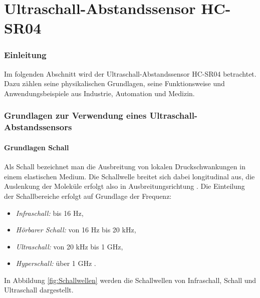 %
%
%

\chapter{Ultraschall-Abstandssensor HC-SR04}\label{HCSR04}


\subsection{Einleitung}

Im folgenden Abschnitt wird der Ultraschall-Abstandssensor HC-SR04 betrachtet. Dazu zählen seine physikalischen Grundlagen, seine Funktionsweise und Anwendungsbeispiele aus Industrie, Automation und Medizin.

\subsection{Grundlagen zur Verwendung eines Ultraschall-Abstandssensors}\label{GrundlagenVerwendungAbstandssensor}

\subsubsection{Grundlagen Schall}

Als Schall bezeichnet man die Ausbreitung von lokalen Druckschwankungen in einem elastischen Medium. Die Schallwelle breitet sich dabei longitudinal aus, die Auslenkung der Moleküle erfolgt also in Ausbreitungsrichtung \cite{Kersten:2024}.
Die Einteilung der Schallbereiche erfolgt auf Grundlage der Frequenz:

\begin{itemize}
    \item \textit{Infraschall:} bis 16 Hz,
    \item \textit{Hörbarer Schall:} von 16 Hz bis 20 kHz,
    \item \textit{Ultraschall:} von 20 kHz bis 1 GHz,
    \item \textit{Hyperschall:} über 1 GHz \cite{Hering:2023}.
\end{itemize}

In Abbildung \ref{fig:Schallwellen} werden die Schallwellen von Infraschall, Schall und Ultraschall dargestellt.

